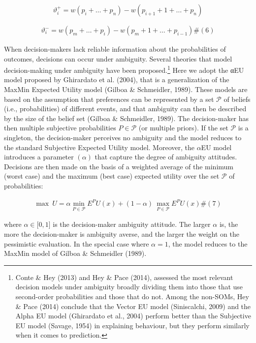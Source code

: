\documentclass[
]{article}
\begin{document}
\[\vartheta_{i}^{+} = w\left( p_{i} + \ldots + p_{n} \right) - w\left( p_{i + 1} + 1 + \ldots + p_{n} \right)\]

\[\begin{array}{r}
\vartheta_{i}^{-} = w\left( p_{m} + \ldots + p_{i} \right) - w\left( p_{m} + 1 + \ldots + p_{i - 1} \right)\#(6)
\end{array}\]

When decision-makers lack reliable information about the probabilities
of outcomes, decisions can occur under ambiguity. Several theories that
model decision-making under ambiguity have been proposed.\footnote{Conte
  \& Hey (2013) and Hey \& Pace (2014), assessed the most relevant
  decision models under ambiguity broadly dividing them into those that
  use second-order probabilities and those that do not. Among the
  non-SOMs, Hey \& Pace (2014) conclude that the Vector EU model
  (Siniscalchi, 2009) and the Alpha EU model (Ghirardato et al., 2004)
  perform better than the Subjective EU model (Savage, 1954) in
  explaining behaviour, but they perform similarly when it comes to
  prediction.} Here we adopt the αEU model proposed by Ghirardato et al.
(2004), that is a generalization of the MaxMin Expected Utility model
(Gilboa \& Schmeidler, 1989). These models are based on the assumption
that preferences can be represented by a set \(\mathcal{P}\) of beliefs
(i.e., probabilities) of different events, and that ambiguity can then
be described by the size of the belief set (Gilboa \& Schmeidler, 1989).
The decision-maker has then multiple subjective probabilities
\(P \in \mathcal{P}\) (or multiple priors). If the set \(\mathcal{P}\)
is a singleton, the decision-maker perceives no ambiguity and the model
reduces to the standard Subjective Expected Utility model. Moreover, the
\(\alpha\)EU model introduces a parameter \((\alpha)\) that capture the
degree of ambiguity attitudes. Decisions are then made on the basis of a
weighted average of the minimum (worst case) and the maximum (best case)
expected utility over the set \(\mathcal{P}\) of probabilities:

\[\begin{array}{r}
\max\ U = {\alpha\min_{P \in \mathcal{P}}{E^{P}U(x)} + (1 - \alpha)\ \max_{P \in \mathcal{P}}{E^{P}U(x)}}\#(7)
\end{array}\]

where \(\alpha \in \lbrack 0,1\rbrack\) is the decision-maker ambiguity
attitude. The larger \(\alpha\) is, the more the decision-maker is
ambiguity averse, and the larger the weight on the pessimistic
evaluation. In the special case where \(\alpha = 1\), the model reduces
to the MaxMin model of Gilboa \& Schmeidler (1989).
\end{document}
